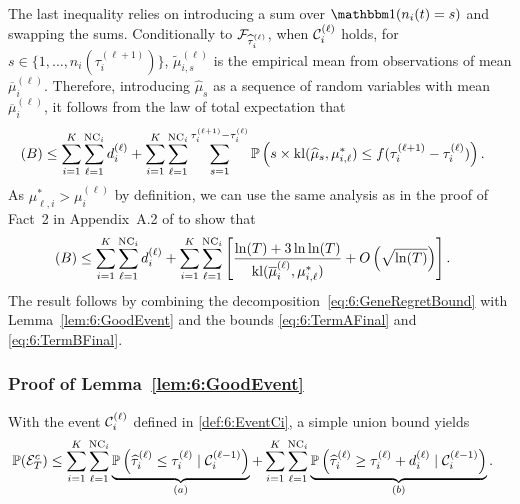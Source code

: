 %
The last inequality relies on introducing a sum over $\indic(n_i(t) = s)$ and swapping the sums. Conditionally to $\mathcal{F}_{\widehat{\tau}_i^{(\ell)}}$, when $\mathcal{C}_i^{(\ell)}$ holds, for $s \in \{1, \ldots, n_i(\tau_i^{(\ell+1)})\}$, $\tilde{\mu}_{i,s}^{(\ell)}$ is the empirical mean from \iid{} observations of mean $\overline{\mu}_i^{(\ell)}$.
Therefore, introducing $\widehat{\mu}_s$ as a sequence of \iid{} random variables with mean $\overline{\mu}_i^{(\ell)}$, it follows from the law of total expectation that
%
\begin{align*}
    (B) & \leq \sum_{i=1}^K\sum_{\ell=1}^{\text{NC}_i} d_i^{(\ell)}
    + \sum_{i=1}^K\sum_{\ell=1}^{\text{NC}_i} \sum_{s=1}^{\tau_i^{(\ell+1)}-\tau_i^{(\ell)}} \mathbb{P}\left(s \times \mathrm{kl}(\widehat{\mu}_{s}, \mu^*_{i,\ell}) \leq f(\tau_i^{(\ell+1)} - \tau_i^{(\ell)})\right).
\end{align*}%
%
As $\mu^*_{\ell,i} > \mu_i^{(\ell)}$ by definition, we can use the same analysis as in the proof of Fact~2 in Appendix~A.2 of \cite{KLUCBJournal} to show that
\begin{align}\label{eq:6:TermBFinal}
    (B) & \leq \sum_{i=1}^K\sum_{\ell=1}^{\text{NC}_i}d_i^{(\ell)}+\sum_{i=1}^K\sum_{\ell=1}^{\text{NC}_i}\left[ \frac{\ln(T) + 3\ln\ln(T)}{\mathrm{kl}(\overline{\mu}_i^{(\ell)},\mu^*_{i,\ell})} + O\left(\sqrt{\ln(T)}\right)\right].
\end{align}
The result follows by combining the decomposition~\eqref{eq:6:GeneRegretBound} with Lemma~\ref{lem:6:GoodEvent} and the bounds \eqref{eq:6:TermAFinal} and \eqref{eq:6:TermBFinal}.


\subsubsection{Proof of Lemma~\ref{lem:6:GoodEvent}}\label{proof:6:GoodEvent}

With the event $\mathcal{C}_i^{(\ell)}$ defined in \eqref{def:6:EventCi}, a simple union bound yields
\begin{align*}
    \mathbb{P}(\mathcal{E}_T^c) & \leq \sum\limits_{i=1}^K\sum\limits_{\ell=1}^{\text{NC}_i} \underbrace{\mathbb{P}\left(\widehat{\tau}_i^{(\ell)} \leq \tau_i^{(\ell)} \;|\; \mathcal{C}_i^{(\ell-1)}\right)}_{(a)} + \sum\limits_{i=1}^K\sum\limits_{\ell=1}^{\text{NC}_i} \underbrace{\mathbb{P}\left(\widehat{\tau}_i^{(\ell)} \geq \tau_i^{(\ell)} + d_i^{(\ell)} \;|\; \mathcal{C}_i^{(\ell-1)}\right)}_{(b)}.
\end{align*}

